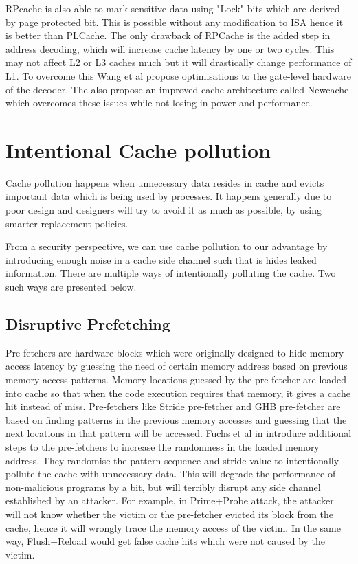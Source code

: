 RPcache is also able to mark sensitive data using "Lock" bits which are derived by page protected bit.
This is possible without any modification to ISA hence it is better than PLCache. The only drawback
of RPCache is the added step in address decoding, which will increase cache latency by one or two cycles.
This may not affect L2 or L3 caches much but it will drastically change performance of L1.
To overcome this Wang et al propose optimisations to the gate-level hardware of the decoder.
The also propose an improved cache architecture called Newcache  which overcomes
these issues while not losing in power and performance.

\section{Intentional Cache pollution}

Cache pollution happens when unnecessary data resides in cache and evicts important data which
is being used by processes. It happens generally due to poor design and designers will
try to avoid it as much as possible, by using smarter replacement policies.

From a security perspective, we can use cache pollution to our advantage by introducing enough noise in
a cache side channel such that is hides leaked information. There are multiple ways of intentionally
polluting the cache. Two such ways are presented below.

\subsection{Disruptive Prefetching}

Pre-fetchers are hardware blocks which were originally designed to hide memory access latency
by guessing the need of certain memory address based on previous memory access patterns.
Memory locations guessed by the pre-fetcher are loaded into cache so that when the code
execution requires that memory, it gives a cache hit instead of miss. Pre-fetchers like
Stride pre-fetcher and GHB pre-fetcher are based on finding patterns in the previous memory accesses
and guessing that the next locations in that pattern will be accessed. Fuchs et al in 
introduce additional steps to the pre-fetchers to increase the randomness in the loaded memory address.
They randomise the pattern sequence and stride value to intentionally pollute the cache with unnecessary data.
This will degrade the performance of non-malicious programs by a bit, but will terribly disrupt any 
side channel established by an attacker. For example, in Prime+Probe attack, the attacker will not know
whether the victim or the pre-fetcher evicted its block from the cache, hence it will wrongly trace the memory
access of the victim. In the same way, Flush+Reload would get false cache hits which were not caused by the victim.

